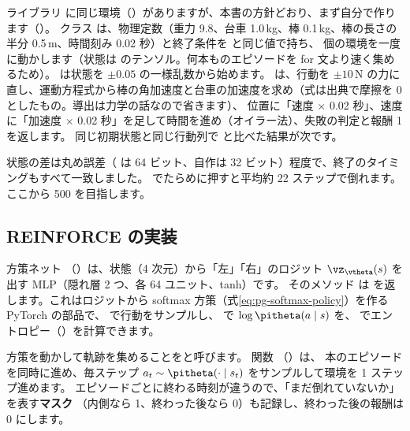 ライブラリ  に同じ環境（）がありますが、本書の方針どおり、まず自分で作ります（）。
クラス  は、物理定数（重力 9.8、台車 1.0\,kg、棒 0.1\,kg、棒の長さの半分 0.5\,m、時間刻み 0.02 秒）と終了条件を  と同じ値で持ち、
 個の環境を一度に動かします（状態は  のテンソル。何本ものエピソードを for 文より速く集めるため）。
 は状態を $\pm0.05$ の一様乱数から始めます。
 は、行動を $\pm10$\,N の力に直し、運動方程式から棒の角加速度と台車の加速度を求め（式は出典\cite{barto1983neuronlike}で摩擦を 0 としたもの。導出は力学の話なので省きます）、
位置に「速度 $\times$ 0.02 秒」、速度に「加速度 $\times$ 0.02 秒」を足して時間を進め（オイラー法）、失敗の判定と報酬 1 を返します。
同じ初期状態と同じ行動列で  と比べた結果が次です。


状態の差は丸め誤差（ は 64 ビット、自作は 32 ビット）程度で、終了のタイミングもすべて一致しました。
でたらめに押すと平均約 22 ステップで倒れます。ここから 500 を目指します。

\subsection*{REINFORCE の実装}

方策ネット （）は、状態（4 次元）から「左」「右」のロジット $\vz_{\vtheta}(s)$ を出す MLP（隠れ層 2 つ、各 64 ユニット、tanh）です。
そのメソッド  は  を返します。これはロジットから softmax 方策（式\eqref{eq:pg-softmax-policy}）を作る PyTorch の部品で、
 で行動をサンプルし、 で $\log\pitheta(a\mid s)$ を、 でエントロピー（）を計算できます。

方策を動かして軌跡を集めることをと呼びます。
関数 （）は、 本のエピソードを同時に進め、毎ステップ $a_t\sim\pitheta(\cdot\mid s_t)$ をサンプルして環境を 1 ステップ進めます。
エピソードごとに終わる時刻が違うので、「まだ倒れていないか」を表す\textbf{マスク} （内側なら 1、終わった後なら 0）も記録し、終わった後の報酬は 0 にします。


